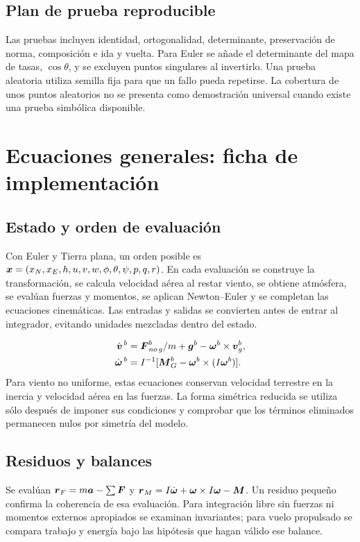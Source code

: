 \section{Plan de prueba reproducible}
Las pruebas incluyen identidad, ortogonalidad, determinante, preservación de norma, composición e ida y vuelta. Para Euler se añade el determinante del mapa de tasas, $\cos\theta$, y se excluyen puntos singulares al invertirlo. Una prueba aleatoria utiliza semilla fija para que un fallo pueda repetirse. La cobertura de unos puntos aleatorios no se presenta como demostración universal cuando existe una prueba simbólica disponible.

\chapter{Ecuaciones generales: ficha de implementación}
\section{Estado y orden de evaluación}
Con Euler y Tierra plana, un orden posible es $\boldsymbol{x}=(x_N,x_E,h,u,v,w,\phi,\theta,\psi,p,q,r)$. En cada evaluación se construye la transformación, se calcula velocidad aérea al restar viento, se obtiene atmósfera, se evalúan fuerzas y momentos, se aplican Newton--Euler y se completan las ecuaciones cinemáticas. Las entradas y salidas se convierten antes de entrar al integrador, evitando unidades mezcladas dentro del estado.

\begin{align}
\dot{\boldsymbol{v}}^{\,b}&=\boldsymbol{F}_{no\,g}^b/m+\boldsymbol{g}^b-\boldsymbol{\omega}^b\times\boldsymbol{v}_g^b,\\
\dot{\boldsymbol{\omega}}^{\,b}&=I^{-1}[\boldsymbol{M}_G^b-\boldsymbol{\omega}^b\times(I\boldsymbol{\omega}^b)].
\end{align}
Para viento no uniforme, estas ecuaciones conservan velocidad terrestre en la inercia y velocidad aérea en las fuerzas. La forma simétrica reducida se utiliza sólo después de imponer sus condiciones y comprobar que los términos eliminados permanecen nulos por simetría del modelo.

\section{Residuos y balances}
Se evalúan $\boldsymbol{r}_F=m\boldsymbol{a}-\sum\boldsymbol{F}$ y $\boldsymbol{r}_M=I\dot{\boldsymbol{\omega}}+\boldsymbol{\omega}\times I\boldsymbol{\omega}-\boldsymbol{M}$. Un residuo pequeño confirma la coherencia de esa evaluación. Para integración libre sin fuerzas ni momentos externos apropiados se examinan invariantes; para vuelo propulsado se compara trabajo y energía bajo las hipótesis que hagan válido ese balance.

